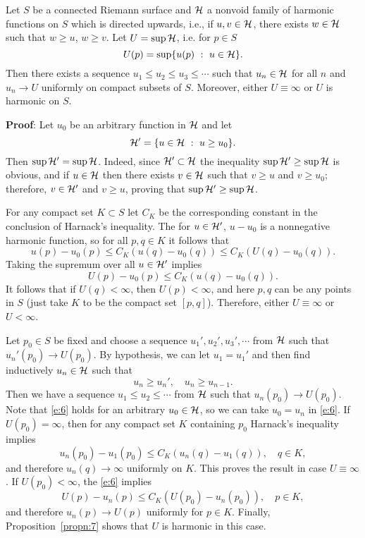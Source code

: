 \documentclass[a4paper,11pt]{article}
\begin{document}
\begin{thm}
  Let $S$ be a connected Riemann surface and ${\mathcal{H}}$ a nonvoid family
  of harmonic functions on $S$ which is directed upwards, i.e., if $u,
  v \in {\mathcal{H}}$, there exists $w \in {\mathcal{H}}$ such that $w \ge u$, $w \ge
  v$.  Let $U = \sup {\mathcal{H}}$, i.e. for $p \in S$
  $$
  U(p) = \sup\{u(p) ~:~ u \in {\mathcal{H}}\}.
  $$
  Then there exists a sequence $u_1 \le u_2 \le u_3 \le \cdots$ such
  that $u_n \in {\mathcal{H}}$ for all $n$ and $u_n \to U$ uniformly on
  compact subsets of $S$.  Moreover, either $U \equiv \infty$ or $U$
  is harmonic on $S$.
\end{thm}

\begin{mdframed}
  \textbf{Proof}:  Let $u_0$ be an arbitrary function in ${\mathcal{H}}$ and
  let
  $$
  {\mathcal{H}}' = \{u \in {\mathcal{H}} ~:~ u \ge u_0\}.
  $$
  Then $\sup {\mathcal{H}}' = \sup {\mathcal{H}}$.  Indeed, since ${\mathcal{H}}' \subset
  {\mathcal{H}}$ the inequality $\sup {\mathcal{H}}' \ge \sup {\mathcal{H}}$ is obvious, and
  if $u \in {\mathcal{H}}$ then there exists $v \in {\mathcal{H}}$ such that $v \ge u$
  and $v \ge u_0$; therefore, $v \in {\mathcal{H}}'$ and $v \ge u$, proving
  that $\sup {\mathcal{H}}' \ge \sup {\mathcal{H}}$.

  For any compact set $K \subset S$ let $C_K$ be the corresponding
  constant in the conclusion of Harnack's inequality.  The for $u \in
  {\mathcal{H}}'$, $u - u_0$ is a nonnegative harmonic function, so for all
  $p, q \in K$ it follows that
  $$
  u(p) - u_0(p) \le C_K(u(q)-u_0(q)) 
  \le C_K(U(q)-u_0(q)).
  $$
  Taking the supremum over all $u \in {\mathcal{H}}'$ implies
  \begin{equation}
    \label{e:6}
    U(p) - u_0(p) \le C_K(u(q)-u_0(q)).
  \end{equation}
  It follows that if $U(q) < \infty$, then $U(p) < \infty$, and here
  $p,q$ can be any points in $S$ (just take $K$ to be the compact set
  $[p,q]$).  Therefore, either $U \equiv \infty$ or $U < \infty$.

  Let $p_0 \in S$ be fixed and choose a sequence $u_1', u_2', u_3',
  \cdots$ from ${\mathcal{H}}$ such that $u_n'(p_0) \to U(p_0)$.  By
  hypothesis, we can let $u_1 = u_1'$ and then find inductively $u_n
  \in {\mathcal{H}}$ such that
  $$
  u_n \ge u_n',\quad u_n \ge u_{n-1}.
  $$
  Then we have a sequence $u_1 \le u_2 \le \cdots$ from ${\mathcal{H}}$ such
  that $u_n(p_0) \to U(p_0)$.  Note that \eqref{e:6} holds for an
  arbitrary $u_0 \in {\mathcal{H}}$, so we can take $u_0 = u_n$ in
  \eqref{e:6}.  If $U(p_0) = \infty$, then for any compact set $K$
  containing $p_0$ Harnack's inequality implies
  $$
  u_n(p_0) - u_1(p_0) \le C_K(u_n(q) - u_1(q)), \quad q\in K,
  $$
  and therefore $u_n(q) \to \infty$ uniformly on $K$.  This proves the
  result in case $U \equiv \infty$.  If $U(p_0) < \infty$, the
  \eqref{e:6} implies
  $$
  U(p) - u_n(p) \le C_K(U(p_0)-u_n(p_0)),\quad p \in K,
  $$
  and therefore $u_n(p) \to U(p)$ uniformly for $p \in K$.  Finally,
  Proposition~\ref{propn:7} shows that $U$ is harmonic in this case.
\end{mdframed}
\end{document}
